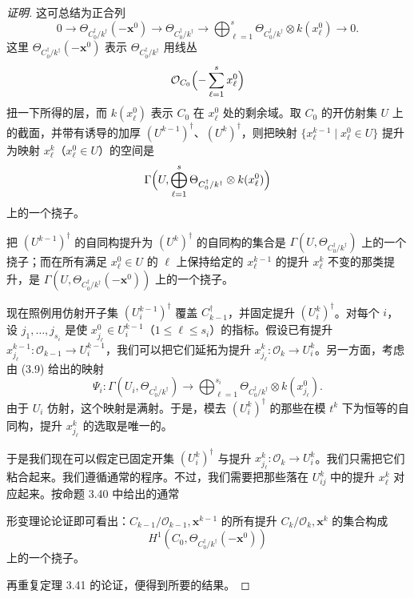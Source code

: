 \begin{proof}[证明]
这可总结为正合列
\begin{equation}
0\to\Theta_{C_0^{\dagger}/k^{\dagger}}(-\mathbf{x}^0)\to\Theta_{C_0^{\dagger}/k^{\dagger}}\to\bigoplus_{\ell=1}^{s}\Theta_{C_0^{\dagger}/k^{\dagger}}\otimes k(x_\ell^0)\to0. \tag{3.9}
\end{equation}
这里 $\Theta_{C_0^{\dagger}/k^{\dagger}}(-\mathbf{x}^0)$ 表示 $\Theta_{C_0^{\dagger}/k^{\dagger}}$ 用线丛
\[
  \mathcal{O}_{C_0}\Bigl(-\sum_{\ell=1}^{s}x_\ell^0\Bigr)
\]
扭一下所得的层，而 $k(x_\ell^0)$ 表示 $C_0$ 在 $x_\ell^0$ 处的剩余域。取 $C_0$ 的开仿射集 $U$ 上的截面，并带有诱导的加厚 $(U^{k-1})^{\dagger}$、$(U^{k})^{\dagger}$，则把映射 $\{x_\ell^{k-1}\mid x_\ell^0\in U\}$ 提升为映射 $x_\ell^{k}$（$x_\ell^0\in U$）的空间是
\[
  \Gamma\Bigl(U,\bigoplus_{\ell=1}^{s}\Theta_{C_0^{\dagger}/k^{\dagger}}\otimes k(x_\ell^0)\Bigr)
\]
上的一个挠子。

把 $(U^{k-1})^{\dagger}$ 的自同构提升为 $(U^{k})^{\dagger}$ 的自同构的集合是 $\Gamma(U,\Theta_{C_0^{\dagger}/k^{\dagger}})$ 上的一个挠子；而在所有满足 $x_\ell^0\in U$ 的 $\ell$ 上保持给定的 $x_\ell^{k-1}$ 的提升 $x_\ell^{k}$ 不变的那类提升，是 $\Gamma(U,\Theta_{C_0^{\dagger}/k^{\dagger}}(-\mathbf{x}^0))$ 上的一个挠子。

现在照例用仿射开子集 $(U_i^{k-1})^{\dagger}$ 覆盖 $C_{k-1}^{\dagger}$，并固定提升 $(U_i^{k})^{\dagger}$。对每个 $i$，设 $j_1,\dots,j_{s_i}$ 是使 $x_{j_\ell}^0\in U_i^{k-1}$（$1\le\ell\le s_i$）的指标。假设已有提升 $x_{j_\ell}^{k-1}:\mathcal{O}_{k-1}\to U_i^{k-1}$，我们可以把它们延拓为提升 $x_{j_\ell}^{k}:\mathcal{O}_k\to U_i^{k}$。另一方面，考虑由 (3.9) 给出的映射
\[
  \Psi_i:\Gamma(U_i,\Theta_{C_0^{\dagger}/k^{\dagger}})\to\bigoplus_{\ell=1}^{s_i}\Theta_{C_0^{\dagger}/k^{\dagger}}\otimes k(x_{j_\ell}^0).
\]
由于 $U_i$ 仿射，这个映射是满射。于是，模去 $(U_i^{k})^{\dagger}$ 的那些在模 $t^k$ 下为恒等的自同构，提升 $x_{j_\ell}^{k}$ 的选取是唯一的。

于是我们现在可以假定已固定开集 $(U_i^{k})^{\dagger}$ 与提升 $x_{j_\ell}^{k}:\mathcal{O}_k\to U_i^{k}$。我们只需把它们粘合起来。我们遵循通常的程序。不过，我们需要把那些落在 $U_{ij}^{k}$ 中的提升 $x_\ell^{k}$ 对应起来。按命题 3.40 中给出的通常

形变理论论证即可看出：$C_{k-1}/\mathcal{O}_{k-1},\mathbf{x}^{k-1}$ 的所有提升 $C_k/\mathcal{O}_k,\mathbf{x}^k$ 的集合构成
\[
  H^1(C_0,\Theta_{C_0^{\dagger}/k^{\dagger}}(-\mathbf{x}^0))
\]
上的一个挠子。

再重复定理 3.41 的论证，便得到所要的结果。
\end{proof}

